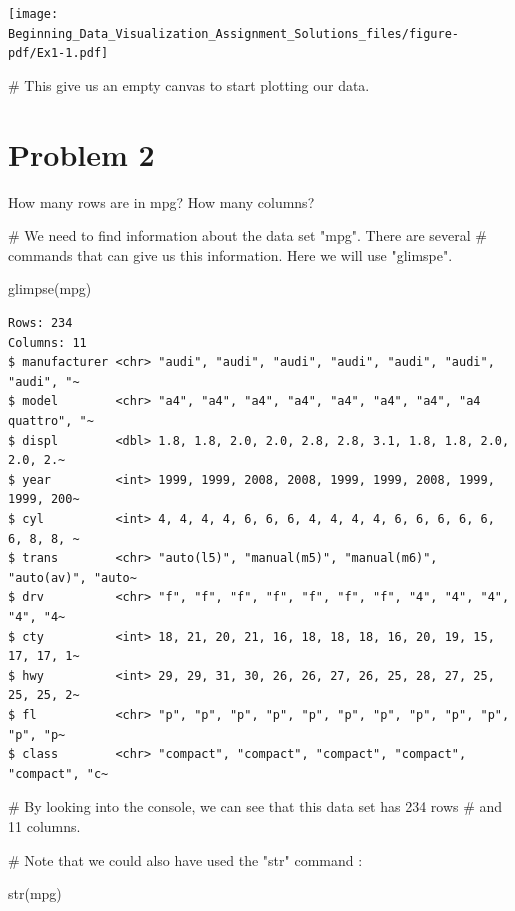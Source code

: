 \documentclass[
  letterpaper,
  DIV=11,
  numbers=noendperiod]{scrreprt}
\newenvironment{Shaded}{\begin{snugshade}}{\end{snugshade}}
\newcommand{\CommentTok}[1]{\textcolor[rgb]{0.37,0.37,0.37}{#1}}
\newcommand{\FunctionTok}[1]{\textcolor[rgb]{0.28,0.35,0.67}{#1}}
\newcommand{\NormalTok}[1]{\textcolor[rgb]{0.00,0.23,0.31}{#1}}
\begin{document}
\texttt{[image: Beginning\_Data\_Visualization\_Assignment\_Solutions\_files/figure-pdf/Ex1-1.pdf]}

\begin{Shaded}
\begin{Highlighting}[]
\CommentTok{\# This give us an empty canvas to start plotting our data.}
\end{Highlighting}
\end{Shaded}

\section*{Problem 2}\label{problem-2-3}


How many rows are in mpg? How many columns?

\begin{Shaded}
\begin{Highlighting}[]
\CommentTok{\# We need to find information about the data set "mpg". There are several }
\CommentTok{\# commands that can give us this information. Here we will use "glimspe".}


\FunctionTok{glimpse}\NormalTok{(mpg)}
\end{Highlighting}
\end{Shaded}

\begin{verbatim}
Rows: 234
Columns: 11
$ manufacturer <chr> "audi", "audi", "audi", "audi", "audi", "audi", "audi", "~
$ model        <chr> "a4", "a4", "a4", "a4", "a4", "a4", "a4", "a4 quattro", "~
$ displ        <dbl> 1.8, 1.8, 2.0, 2.0, 2.8, 2.8, 3.1, 1.8, 1.8, 2.0, 2.0, 2.~
$ year         <int> 1999, 1999, 2008, 2008, 1999, 1999, 2008, 1999, 1999, 200~
$ cyl          <int> 4, 4, 4, 4, 6, 6, 6, 4, 4, 4, 4, 6, 6, 6, 6, 6, 6, 8, 8, ~
$ trans        <chr> "auto(l5)", "manual(m5)", "manual(m6)", "auto(av)", "auto~
$ drv          <chr> "f", "f", "f", "f", "f", "f", "f", "4", "4", "4", "4", "4~
$ cty          <int> 18, 21, 20, 21, 16, 18, 18, 18, 16, 20, 19, 15, 17, 17, 1~
$ hwy          <int> 29, 29, 31, 30, 26, 26, 27, 26, 25, 28, 27, 25, 25, 25, 2~
$ fl           <chr> "p", "p", "p", "p", "p", "p", "p", "p", "p", "p", "p", "p~
$ class        <chr> "compact", "compact", "compact", "compact", "compact", "c~
\end{verbatim}

\begin{Shaded}
\begin{Highlighting}[]
\CommentTok{\# By looking into the console, we can see that this data set has 234 rows}
\CommentTok{\# and 11 columns.}

\CommentTok{\# Note that we could also have used the "str" command :}

\FunctionTok{str}\NormalTok{(mpg)}
\end{Highlighting}
\end{Shaded}
\end{document}
